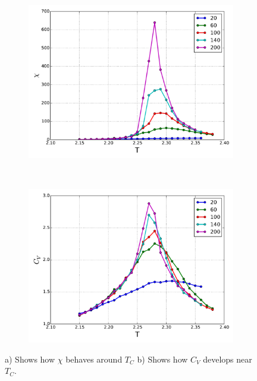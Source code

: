 \begin{figure}[H]
    \centering
    \begin{subfigure}{0.5\textwidth}
        \centering
        \includegraphics[width=\linewidth]{result/bilder/Tc/chi-Tc}
        \caption{}
    \end{subfigure}%
    ~ 
    \begin{subfigure}{0.5\textwidth}
        \centering
        \includegraphics[width=\linewidth]{result/bilder/Tc/cv-Tc}
        \caption{}
    \end{subfigure}
    \caption{a) Shows how $\chi$ behaves around $T_C$ b) Shows how $C_V$ develops near $T_C$.}
    \label{fig:tc-chi-cv}
\end{figure}

